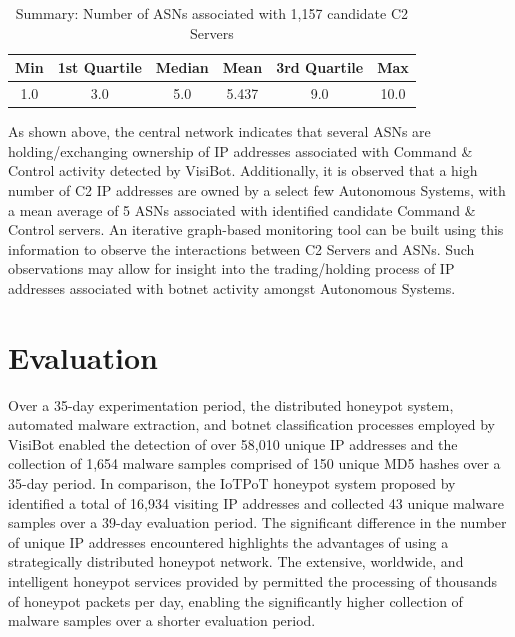 \begin{table}[!htb]
    \centering
    \caption{Summary: Number of ASNs associated with 1,157 candidate C2 Servers}
    \label{tab:c2_asn_history_summary}
    \begin{tabular}{|c|c|c|c|c|c|}
    \hline
    \textbf{Min} & \textbf{1st Quartile} & \textbf{Median} & \textbf{Mean} & \textbf{3rd Quartile} & \textbf{Max} \\ \hline
    1.0 & 3.0 & 5.0 & 5.437 & 9.0 & 10.0 \\ \hline
    \end{tabular}
\end{table}

As shown above, the central network indicates that several ASNs are holding/exchanging ownership of IP addresses associated with Command \& Control activity detected by VisiBot. Additionally, it is observed that a high number of C2 IP addresses are owned by a select few Autonomous Systems, with a mean average of 5 ASNs associated with identified candidate Command \& Control servers. An iterative graph-based monitoring tool can be built using this information to observe the interactions between C2 Servers and ASNs. Such observations may allow for insight into the trading/holding process of IP addresses associated with botnet activity amongst Autonomous Systems.



\section{Evaluation}

Over a 35-day experimentation period, the distributed honeypot system, automated malware extraction, and botnet classification processes employed by VisiBot enabled the detection of over 58,010 unique IP addresses and the collection of 1,654 malware samples comprised of 150 unique MD5 hashes over a 35-day period. In comparison, the IoTPoT honeypot system proposed by \citet{PaPa2016} identified a total of 16,934 visiting IP addresses and collected 43 unique malware samples over a 39-day evaluation period. The significant difference in the number of unique IP addresses encountered highlights the advantages of using a strategically distributed honeypot network. The extensive, worldwide, and intelligent honeypot services provided by \citet{BadPackets} permitted the processing of thousands of honeypot packets per day, enabling the significantly higher collection of malware samples over a shorter evaluation period.

